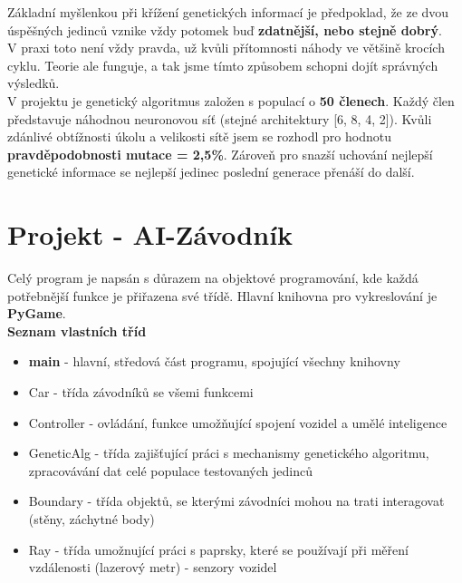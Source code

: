 \documentclass[a4paper,12pt]{article}
\newcommand{\tab}
{
    \hspace*{1em}
}
\begin{document}
        \vspace{0.75cm}
        Základní myšlenkou při křížení genetických informací je předpoklad, že ze dvou úspěšných
        jedinců vznike vždy potomek buď \textbf{zdatnější, nebo stejně dobrý}.\\
        V praxi toto není vždy pravda, už kvůli přítomnosti náhody ve většině krocích cyklu. 
        Teorie ale funguje, a tak jsme tímto způsobem schopni dojít správných výsledků.
        \\

        V projektu je genetický algoritmus založen s populací o \textbf{50 členech}. 
        Každý člen představuje náhodnou neuronovou síť (stejné architektury [6, 8, 4, 2]).
        Kvůli zdánlivé obtížnosti úkolu a velikosti sítě jsem se rozhodl pro hodnotu 
        \textbf{pravděpodobnosti mutace = 2,5\%}. Zároveň pro snazší uchování nejlepší 
        genetické informace se nejlepší jedinec poslední generace přenáší do další.

    \pagebreak
    \section{Projekt - AI-Závodník}
        \tab Celý program je napsán s důrazem na objektové programování, kde každá potřebnější funkce 
        je přiřazena své třídě. Hlavní knihovna pro vykreslování je \textbf{PyGame}.
        \\

        \textbf{Seznam vlastních tříd}
        \begin{itemize}[noitemsep]
            \vspace{-0.5em}
            \item \textbf{main} - hlavní, středová část programu, spojující všechny knihovny
            \item Car - třída závodníků se všemi funkcemi
            \item Controller - ovládání, funkce umožňující spojení vozidel a umělé inteligence
            \item GeneticAlg - třída zajišťující práci s mechanismy genetického algoritmu,
                zpracovávání dat celé populace testovaných jedinců
            \item Boundary - třída objektů, se kterými závodníci mohou na trati interagovat (stěny, záchytné body)
            \item Ray - třída umožnující práci s paprsky, které se používají při měření vzdálenosti
                (lazerový metr) - senzory vozidel
        \end{itemize}
\end{document}

